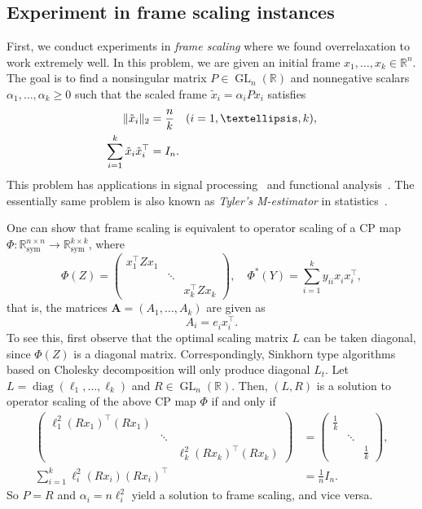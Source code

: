 \documentclass[a4paper]{article}
\newcommand{\R}{\mathbb{R}}
\newcommand{\bA}{\mathbf{A}}
\DeclareMathOperator{\diag}{diag}
\DeclareMathOperator{\GL}{GL}
\DeclarePairedDelimiter{\norm}{\lVert}{\rVert}
\theoremstyle{definition}
\numberwithin{equation}{section}
\begin{document}
\subsection{Experiment in frame scaling instances}

First, we conduct experiments in \emph{frame scaling} where we found overrelaxation to work extremely well. In this problem, we are given an initial frame $x_1, \dots, x_k \in \R^n$. The goal is to find a nonsingular matrix $P \in \GL_n(\R)$ and nonnegative scalars $\alpha_1, \dots, \alpha_k \geq 0$ such that the scaled frame $\tilde x_i = \alpha_i P x_i$ satisfies 
\begin{align*}
 \norm{\tilde x_i}_2 &= \frac{n}{k} \quad (i = 1, \dots, k), \\
 \sum_{i=1}^k \tilde x_i \tilde x_i^\top &= I_n.
\end{align*}
This problem has applications in signal processing~\cite{Holmes2004} and functional analysis~\cite{Barthe1998}. The essentially same problem is also known as \emph{Tyler's M-estimator} in statistics~\cite{Tyler1987,Franks2020}.

One can show that frame scaling is equivalent to operator scaling of a CP map $\Phi: \R^{n \times n}_{\mathrm{sym}} \to \R^{k \times k}_{\mathrm{sym}}$, where
\[
 \Phi(Z) = 
 \begin{pmatrix}
 x_1^\top Z x_1^{} & & \\
 & \ddots & \\
 & & x_k^\top Z x_k^{}     
 \end{pmatrix},
 \quad
 \Phi^*(Y) = \sum_{i=1}^k y_{ii}^{} x_i^{} x_i^\top,
\]
that is, the matrices $\bA = (A_1,\dots, A_k)$ are given as
\[
 A_i = e_i^{} x_i^\top.
\]
To see this, first observe that the optimal scaling matrix $L$ can be taken diagonal, since $\Phi(Z)$ is a diagonal matrix. Correspondingly, Sinkhorn type algorithms based on Cholesky decomposition will only produce diagonal $L_t$. Let $L = \diag(\ell_1, \dots, \ell_k)$ and $R \in \GL_n(\R)$. Then, $(L, R)$ is a solution to operator scaling of the above CP map $\Phi$ if and only if 
\begin{align*}
 \begin{pmatrix}
    \ell_1^2 (R x_1)^\top (R x_1) & & \\
    & \ddots & \\
    & & \ell_k^2 (R x_k)^\top (R x_k)
 \end{pmatrix} 
 &= \begin{pmatrix}
    \frac{1}{k} & & \\
    & \ddots & \\
    & & \frac{1}{k}
 \end{pmatrix}, \\
 \sum_{i=1}^k \ell_i^2 (R x_i)(R x_i)^\top &= \frac{1}{n}I_n.
\end{align*}
So $P = R$ and $\alpha_i = n\ell_i^2$ yield a solution to frame scaling, and vice versa.
\end{document}
